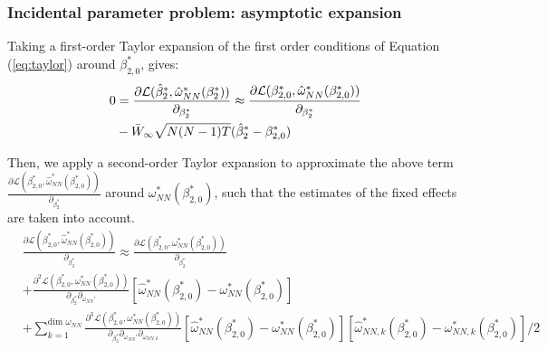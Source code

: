 \begin{frame}
    \frametitle{Incidental parameter problem: asymptotic expansion}
    Taking a first-order Taylor expansion of the first order conditions of Equation (\ref{eq:taylor}) around $\beta_{2,0}^*$, gives:
    \begin{align} 
     0 &= \frac{\partial \mathcal{L} (\hat{\beta}_2^*, \hat{\omega}_{NN}^*(\beta_2^*))}{\partial_{\beta_2^*}}  \approx \frac{\partial \mathcal{L} ({\beta}_{2,0}^*, \hat{\omega}_{NN}^*(\beta_{2,0}^*))}{\partial_{\beta_2^*}} \nonumber \\
     &- \Bar{W}_\infty \sqrt{N(N-1)T} (\hat{\beta}_2^* - \beta_{2,0}^*)
    \end{align}
    
    Then, we apply a second-order Taylor expansion to approximate the above term $\frac{\partial  \mathcal{L} ({\beta}_{2,0}^*, \hat{\omega}_{NN}^*(\beta_{2,0}^*))}{\partial_{\beta_2^*}}$ around $\omega_{NN}^*(\beta_{2,0}^*)$, such that the estimates of the fixed effects are taken into account.
    \begin{align}
        &\frac{\partial \mathcal{L} ({\beta}_{2,0}^*, \hat{\omega}_{NN}^*(\beta_{2,0}^*))}{\partial_{\beta_{2}^*}}  \approx \frac{\partial \mathcal{L} ({\beta}_{2,0}^*, {\omega}_{NN}^*(\beta_{2,0}^*))}{\partial_{\beta_{2}^*} } \\
        &+ \frac{\partial^2 \mathcal{L} ({\beta}_{2,0}^*, {\omega}_{NN}^*(\beta_{2,0}^*)) }{\partial_{\beta_{2}^*} \partial_{\omega_{NN}'} }[ \hat{\omega}_{NN}^* (\beta_{2,0}^*) - \omega_{NN}^* (\beta_{2,0}^*)]  \nonumber\\
        &+ \sum_{k = 1}^{\text{dim } \omega_{NN}} \frac{\partial^3 \mathcal{L} ({\beta}_{2,0}^*, {\omega}_{NN}^*(\beta_{2,0}^*))}{\partial_{\beta_{2}^*} \partial_{\omega_{NN}'} \partial_{\omega_{NN,k}}}[ \hat{\omega}_{NN}^* (\beta_{2,0}^*) - \omega_{NN}^* (\beta_{2,0}^*)] [ \hat{\omega}_{NN,k}^* (\beta_{2,0}^*) - \omega_{NN,k}^* (\beta_{2,0}^*)] / 2 \nonumber
    \end{align}
\end{frame}
    
